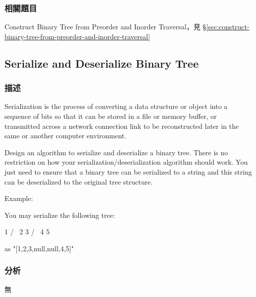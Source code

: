 \subsubsection{相關題目}
\begindot
\item Construct Binary Tree from Preorder and Inorder Traversal，見 \S \ref{sec:construct-binary-tree-from-preorder-and-inorder-traversal}
\myenddot

\subsection{Serialize and Deserialize Binary Tree}
\label{sec:serialize-and-deserialize-binary-tree}


\subsubsection{描述}
Serialization is the process of converting a data structure or object into a sequence of bits so that it can be stored in a file or memory buffer, or transmitted across a network connection link to be reconstructed later in the same or another computer environment.

Design an algorithm to serialize and deserialize a binary tree. There is no restriction on how your serialization/deserialization algorithm should work. You just need to ensure that a binary tree can be serialized to a string and this string can be deserialized to the original tree structure.

Example:
\begin{Code}
You may serialize the following tree:

    1
   / \
  2   3
     / \
    4   5

as "[1,2,3,null,null,4,5]"
\end{Code}

\subsubsection{分析}
無


